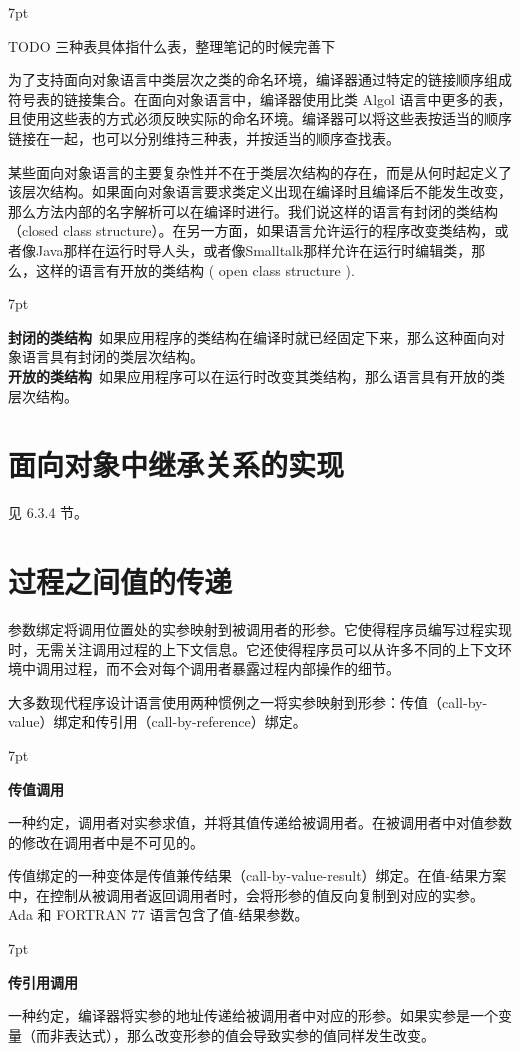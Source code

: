 \documentclass[12pt]{article}
\newenvironment{formal}{%
\def\FrameCommand{%
\hspace{1pt}%
{\color{DarkBlue}\vrule width 2pt}%
{\color{formalshade}\vrule width 4pt}%
\colorbox{formalshade}%
}%
\MakeFramed{\advance\hsize-\width\FrameRestore}%
\noindent\hspace{-4.55pt}%
\begin{adjustwidth}{}{7pt}%
\vspace{2pt}\vspace{2pt}%
}
{%
\vspace{2pt}\end{adjustwidth}\endMakeFramed%
}
\begin{document}
\begin{formal}
TODO 三种表具体指什么表，整理笔记的时候完善下
\end{formal}
为了支持面向对象语言中类层次之类的命名环境，编译器通过特定的链接顺序组成符号表的链接集合。在面向对象语言中，编译器使用比类 Algol 语言中更多的表，且使用这些表的方式必须反映实际的命名环境。编译器可以将这些表按适当的顺序链接在一起，也可以分别维持三种表，并按适当的顺序查找表。

某些面向对象语言的主要复杂性并不在于类层次结构的存在，而是从何时起定义了该层次结构。如果面向对象语言要求类定义出现在编译时且编译后不能发生改变，那么方法内部的名字解析可以在编译时进行。我们说这样的语言有封闭的类结构（closed class structure）。在另一方面，如果语言允许运行的程序改变类结构，或者像Java那样在运行时导人头，或者像Smalltalk那样允许在运行时编辑类，那么，这样的语言有开放的类结构 ( open class structure ).

\begin{formal}
\textbf{封闭的类结构}\ 如果应用程序的类结构在编译时就已经固定下来，那么这种面向对象语言具有封闭的类层次结构。\\
\textbf{开放的类结构}\ 如果应用程序可以在运行时改变其类结构，那么语言具有开放的类层次结构。
\end{formal}

\section*{面向对象中继承关系的实现}

见 6.3.4 节。

\section*{过程之间值的传递}

参数绑定将调用位置处的实参映射到被调用者的形参。它使得程序员编写过程实现时，无需关注调用过程的上下文信息。它还使得程序员可以从许多不同的上下文环境中调用过程，而不会对每个调用者暴露过程内部操作的细节。

大多数现代程序设计语言使用两种惯例之一将实参映射到形参：传值（call-by-value）绑定和传引用（call-by-reference）绑定。

\begin{formal}
\textbf{传值调用} \par
一种约定，调用者对实参求值，并将其值传递给被调用者。在被调用者中对值参数的修改在调用者中是不可见的。
\end{formal}

传值绑定的一种变体是传值兼传结果（call-by-value-result）绑定。在值-结果方案中，在控制从被调用者返回调用者时，会将形参的值反向复制到对应的实参。 Ada 和 FORTRAN 77 语言包含了值-结果参数。

\begin{formal}
\textbf{传引用调用} \par
一种约定，编译器将实参的地址传递给被调用者中对应的形参。如果实参是一个变量（而非表达式），那么改变形参的值会导致实参的值同样发生改变。
\end{formal}
\end{document}
